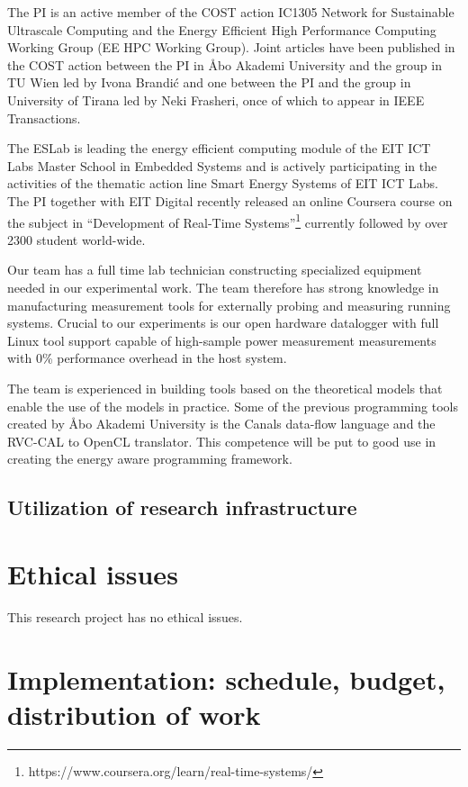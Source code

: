 \documentclass{article}
\begin{document}
The PI is an active member of the COST action IC1305 Network for Sustainable Ultrascale Computing and the Energy Efficient High Performance Computing Working Group (EE HPC Working Group). 
Joint articles have been published in the COST action between the PI in \AA{}bo Akademi University and the group in TU Wien led by Ivona Brandi\'{c} and one between the PI and the group in University of Tirana led by Neki Frasheri, once of which to appear in IEEE Transactions.

The ESLab is leading the energy efficient computing module of the EIT ICT Labs Master School in Embedded Systems and is actively participating in the activities of the thematic action line Smart Energy Systems of EIT ICT Labs.
The PI together with EIT Digital recently released an online Coursera course on the subject in ``Development of Real-Time Systems''\footnote{https://www.coursera.org/learn/real-time-systems/} currently followed by over 2300 student world-wide.

Our team has a full time lab technician constructing specialized equipment needed in our experimental work. 
The team therefore has strong knowledge in manufacturing measurement tools for externally probing and measuring running systems. 
Crucial to our experiments is our open hardware datalogger with full Linux tool support capable of high-sample power measurement measurements with 0\% performance overhead in the host system. 

The team is experienced in building tools based on the theoretical models that enable the use of the models in practice. 
Some of the previous programming tools created by \AA{}bo Akademi University is the Canals data-flow language and the RVC-CAL to OpenCL translator. 
This competence will be put to good use in creating the energy aware programming framework.

\subsection{Utilization of research infrastructure}

\section{Ethical issues}
This research project has no ethical issues.

\section{Implementation: schedule, budget, distribution of work}
\end{document}
